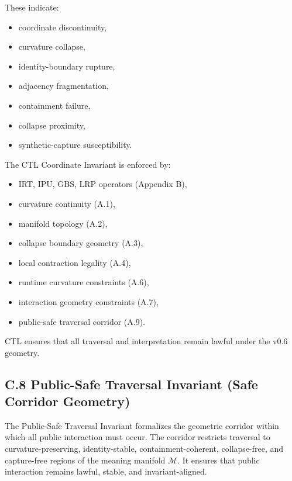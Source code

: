 These indicate:
\begin{itemize}
    \item coordinate discontinuity,
    \item curvature collapse,
    \item identity-boundary rupture,
    \item adjacency fragmentation,
    \item containment failure,
    \item collapse proximity,
    \item synthetic-capture susceptibility.
\end{itemize}

\medskip

\noindent The CTL Coordinate Invariant is enforced by:
\begin{itemize}
    \item IRT, IPU, GBS, LRP operators (Appendix B),
    \item curvature continuity (A.1),
    \item manifold topology (A.2),
    \item collapse boundary geometry (A.3),
    \item local contraction legality (A.4),
    \item runtime curvature constraints (A.6),
    \item interaction geometry constraints (A.7),
    \item public-safe traversal corridor (A.9).
\end{itemize}

\medskip

\noindent CTL ensures that all traversal and interpretation remain lawful under
the v0.6 geometry.



\subsection*{C.8 Public-Safe Traversal Invariant (Safe Corridor Geometry)}

\noindent The Public-Safe Traversal Invariant formalizes the geometric corridor
within which all public interaction must occur. The corridor restricts traversal
to curvature-preserving, identity-stable, containment-coherent, collapse-free,
and capture-free regions of the meaning manifold $\mathcal{M}$. It ensures that
public interaction remains lawful, stable, and invariant-aligned.

